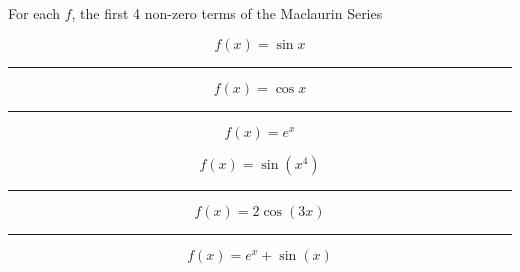 \documentclass{article}
\begin{document}
\begin{landscape}
\thispagestyle{empty}
\begin{center}

{\Huge For each $f$, the first 4 non-zero terms of the Maclaurin Series}

\end{center}
\begin{multicols}{2}

{\Huge


$$
f(x) = \sin x 
$$

\vspace{0.5in}
\hrule
\vspace{0.5in}

$$
f(x) = \cos x 
$$

\vspace{0.5in}
\hrule
\vspace{0.5in}

$$
f(x) = e^x 
$$

\columnbreak


$$
f(x) = \sin (x^4)
$$

\vspace{0.5in}
\hrule
\vspace{0.5in}

$$
f(x) = 2\cos (3x) 
$$

\vspace{0.5in}
\hrule
\vspace{0.5in}

$$
f(x) = e^x + \sin(x)
$$

}

\end{multicols}
\end{landscape}
\end{document}
